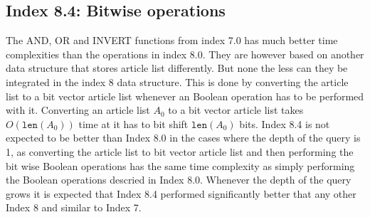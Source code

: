 \subsection{Index 8.4: Bitwise operations}
The AND, OR and INVERT functions from index 7.0 has much better time complexities than the operations in index 8.0. They are however based on another data structure that stores article list differently. But none the less can they be integrated in the index 8 data structure. This is done by converting the article list to a bit vector article list whenever an Boolean operation has to be performed with it. Converting an article list $A_0$ to a bit vector article list takes $O(\texttt{len}(A_0))$ time at it has to bit shift $\texttt{len}(A_0)$ bits. Index 8.4 is not expected to be better than Index 8.0 in the cases where the depth of the query is 1, as converting the article list to bit vector article list and then performing the bit wise Boolean operations has the same time complexity as simply performing the Boolean operations descried in Index 8.0. Whenever the depth of the query grows it is expected that Index 8.4 performed significantly better that any other Index 8 and similar to Index 7. 





